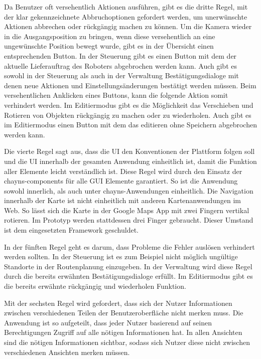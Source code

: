 Da Benutzer oft versehentlich Aktionen ausführen, gibt es die dritte Regel, mit der klar gekennzeichnete Abbruchoptionen gefordert werden, um unerwünschte Aktionen abbrechen oder rückgängig machen zu können. Um die Kamera wieder in die Ausgangsposition zu bringen, wenn diese versehentlich an eine ungewünschte Position bewegt wurde, gibt es in der Übersicht einen entsprechenden Button. In der Steuerung gibt es einen Button mit dem der aktuelle Lieferauftrag des Roboters abgebrochen werden kann. Auch gibt es sowohl in der Steuerung als auch in der Verwaltung Bestätigungsdialoge mit denen neue Aktionen und Einstellungsänderungen bestätigt werden müssen. Beim versehentlichen Anklicken eines Buttons, kann die folgende Aktion somit verhindert werden. Im Editiermodus gibt es die Möglichkeit das Verschieben und Rotieren von Objekten rückgängig zu machen oder zu wiederholen. Auch gibt es im Editiermodus einen Button mit dem das editieren ohne Speichern abgebrochen werden kann.

Die vierte Regel sagt aus, dass die UI den Konventionen der Plattform folgen soll und die UI innerhalb der gesamten Anwendung einheitlich ist, damit die Funktion aller Elemente leicht verständlich ist. Diese Regel wird durch den Einsatz der chayns-components für alle GUI Elemente garantiert. So ist die Anwendung sowohl innerlich, als auch unter chayns-Anwendungen einheitlich. 
Die Navigation innerhalb der Karte ist nicht einheitlich mit anderen Kartenanwendungen im Web. So lässt sich die Karte in der Google Maps App mit zwei Fingern vertikal rotieren. Im Prototyp werden stattdessen drei Finger gebraucht. Dieser Umstand ist dem eingesetzten Framework \deckgl{} geschuldet.

In der fünften Regel geht es darum, dass Probleme die Fehler auslösen verhindert werden sollten. In der Steuerung ist es zum Beispiel nicht möglich ungültige Standorte in der Routenplanung einzugeben. In der Verwaltung wird diese Regel durch die bereits erwähnten Bestätigungsdialoge erfüllt. Im Editiermodus gibt es die bereits erwähnte rückgängig und wiederholen Funktion.

Mit der sechsten Regel wird gefordert, dass sich der Nutzer Informationen zwischen verschiedenen Teilen der Benutzeroberfläche nicht merken muss. Die Anwendung ist so aufgeteilt, dass jeder Nutzer basierend auf seinen Berechtigungen Zugriff auf alle nötigen Informationen hat. In allen Ansichten sind die nötigen Informationen sichtbar, sodass sich Nutzer diese nicht zwischen verschiedenen Ansichten merken müssen.

